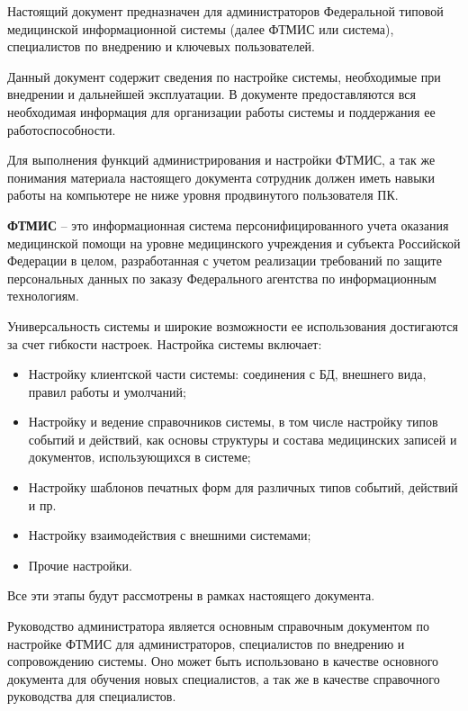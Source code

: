 \newpage
{}

Настоящий документ предназначен для администраторов Федеральной типовой медицинской информационной системы (далее ФТМИС или система), специалистов по внедрению и ключевых пользователей. 

Данный документ содержит сведения по настройке системы, необходимые при внедрении и дальнейшей эксплуатации. В документе предоставляются вся необходимая информация для организации работы системы и поддержания ее работоспособности.

Для выполнения функций администрирования и настройки ФТМИС, а так же понимания материала настоящего документа сотрудник должен иметь навыки работы на компьютере не ниже уровня продвинутого пользователя ПК.

\textbf{ФТМИС} – это информационная система персонифицированного учета оказания медицинской помощи на уровне медицинского учреждения и субъекта Российской Федерации в целом, разработанная с учетом реализации требований по защите персональных данных по заказу Федерального агентства по информационным технологиям. 

Универсальность системы и широкие возможности ее использования достигаются за счет гибкости настроек. Настройка системы включает:
\begin{itemize}
 \item Настройку клиентской части системы: соединения с БД, внешнего вида, правил работы и умолчаний;
 \item Настройку и ведение справочников системы, в том числе настройку типов событий и действий, как основы структуры и состава медицинских записей и документов, использующихся в системе;
 \item Настройку шаблонов печатных форм для различных типов событий, действий и пр.
 \item Настройку взаимодействия с внешними системами;
 \item Прочие настройки.
\end{itemize}
 
Все эти этапы будут рассмотрены в рамках настоящего документа.

\newpage
{}

Руководство администратора является основным справочным документом по настройке ФТМИС для администраторов, специалистов по внедрению и сопровождению системы. Оно может быть использовано в качестве основного документа для обучения новых специалистов, а так же в качестве справочного руководства для специалистов.

